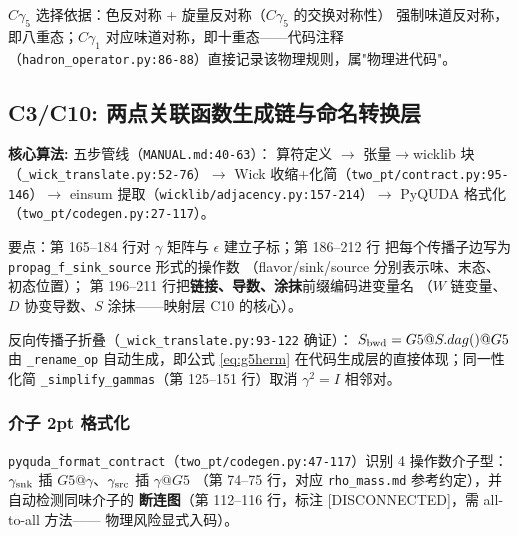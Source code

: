 \documentclass[UTF8]{ctexart}
\begin{document}
\textcolor{phys}{$C\gamma_5$ 选择依据}：色反对称 + 旋量反对称（$C\gamma_5$ 的交换对称性）
强制味道反对称，即八重态；$C\gamma_1$ 对应味道对称，即十重态——代码注释
（\nolinkurl{hadron_operator.py:86-88}）直接记录该物理规则，属"物理进代码"。

\subsection{C3/C10: 两点关联函数生成链与命名转换层}
\begin{algobox}
\textbf{核心算法:} 五步管线（\nolinkurl{MANUAL.md:40-63}）：
算符定义 $\to$ 张量$\to$wicklib 块（\nolinkurl{_wick_translate.py:52-76}）$\to$
Wick 收缩+化简（\nolinkurl{two_pt/contract.py:95-146}）$\to$
einsum 提取（\nolinkurl{wicklib/adjacency.py:157-214}）$\to$
PyQUDA 格式化（\nolinkurl{two_pt/codegen.py:27-117}）。
\end{algobox}

\textcolor{algo}{要点}：第 165--184 行对 $\gamma$ 矩阵与 $\epsilon$ 建立子标；第 186--212 行
把每个传播子边写为 \texttt{propag\_f\_sink\_source} 形式的操作数
（flavor/sink/source 分别表示味、末态、初态位置）；
第 196--211 行把\textbf{链接、导数、涂抹}前缀编码进变量名
（$W$ 链变量、$D$ 协变导数、$S$ 涂抹——\textcolor{map}{映射层 C10 的核心}）。

\textcolor{phys}{反向传播子折叠}（\nolinkurl{_wick_translate.py:93-122} 确证）：
$S_{\rm bwd}=G5 @ S.dag() @ G5$ 由 \texttt{\_rename\_op} 自动生成，即公式
\eqref{eq:g5herm} 在代码生成层的直接体现；同一性化简
\texttt{\_simplify\_gammas}（第 125--151 行）取消 $\gamma^2=I$ 相邻对。

\subsubsection{介子 2pt 格式化}
\texttt{pyquda\_format\_contract}（\nolinkurl{two_pt/codegen.py:47-117}）识别
4 操作数介子型：$\gamma_{\rm snk}$ 插 $G5 @ \gamma$、$\gamma_{\rm src}$ 插 $\gamma @ G5$
（第 74--75 行，对应 \texttt{rho\_mass.md} 参考约定），并自动检测同味介子的
\textbf{断连图}（第 112--116 行，标注 [DISCONNECTED]，需 all-to-all 方法——
物理风险显式入码）。
\end{document}
